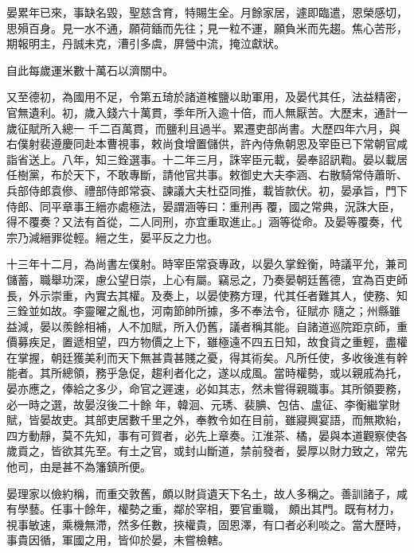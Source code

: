 \begin{pinyinscope}
 晏累年已來，事缺名毀，聖慈含育，特賜生全。月餘家居，遽即臨遣，恩榮感切，思殞百身。見一水不通，願荷鍤而先往；見一粒不運，願負米而先趨。焦心苦形，期報明主，丹誠未克，漕引多虞，屏營中流，掩泣獻狀。



 自此每歲運米數十萬石以濟關中。



 又至德初，為國用不足，令第五琦於諸道榷鹽以助軍用，及晏代其任，法益精密，官無遺利。初，歲入錢六十萬貫，季年所入逾十倍，而人無厭苦。大歷末，通計一歲征賦所入總一
 千二百萬貫，而鹽利且過半。累遷吏部尚書。大歷四年六月，與右僕射裴遵慶同赴本曹視事，敕尚食增置儲供，許內侍魚朝恩及宰臣已下常朝官咸詣省送上。八年，知三銓選事。十二年三月，誅宰臣元載，晏奉詔訊鞫。晏以載居任樹黨，布於天下，不敢專斷，請他官共事。敕御史大夫李涵、右散騎常侍蕭昕、兵部侍郎袁傪、禮部侍郎常袞、諫議大夫杜亞同推，載皆款伏。初，晏承旨，門下侍郎、同平章事王縉亦處極法，晏謂涵等曰：重刑再
 覆，國之常典，況誅大臣，得不覆奏？又法有首從，二人同刑，亦宜重取進止。」涵等從命。及晏等覆奏，代宗乃減縉罪從輕。縉之生，晏平反之力也。



 十三年十二月，為尚書左僕射。時宰臣常袞專政，以晏久掌銓衡，時議平允，兼司儲蓄，職舉功深，慮公望日崇，上心有屬。竊忌之，乃奏晏朝廷舊德，宜為百吏師長，外示崇重，內實去其權。及奏上，以晏使務方理，代其任者難其人，使務、知三銓並如故。李靈曜之亂也，河南節帥所據，多不奉法令，征賦亦
 隨之；州縣雖益減，晏以羨餘相補，人不加賦，所入仍舊，議者稱其能。自諸道巡院距京師，重價募疾足，置遞相望，四方物價之上下，雖極遠不四五日知，故食貨之重輕，盡權在掌握，朝廷獲美利而天下無甚貴甚賤之憂，得其術矣。凡所任使，多收後進有幹能者。其所總領，務乎急促，趨利者化之，遂以成風。當時權勢，或以親戚為托，晏亦應之，俸給之多少，命官之遲速，必如其志，然未嘗得親職事。其所領要務，必一時之選，故晏沒後二十餘
 年，韓洄、元琇、裴腆、包佶、盧征、李衡繼掌財賦，皆晏故吏。其部吏居數千里之外，奉教令如在目前，雖寢興宴語，而無欺紿，四方動靜，莫不先知，事有可賀者，必先上章奏。江淮茶、橘，晏與本道觀察使各歲貢之，皆欲其先至。有土之官，或封山斷道，禁前發者，晏厚以財力致之，常先他司，由是甚不為籓鎮所便。



 晏理家以儉約稱，而重交敦舊，頗以財貨遺天下名土，故人多稱之。善訓諸子，咸有學藝。任事十餘年，權勢之重，鄰於宰相，要官重職，
 頗出其門。既有材力，視事敏速，乘機無滯，然多任數，挾權貴，固恩澤，有口者必利啖之。當大歷時，事貴因循，軍國之用，皆仰於晏，未嘗檢轄。




\end{pinyinscope}
